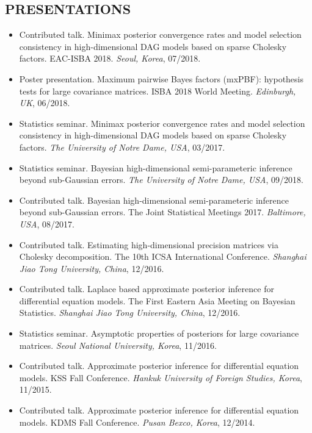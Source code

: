 \documentclass[margin, 10pt]{res} %
\begin{document}
\begin{resume}
 
\section{\sf PRESENTATIONS}

\begin{itemize}
	\item Contributed talk. 
	Minimax posterior convergence rates and model selection consistency in high-dimensional DAG models based on sparse Cholesky factors. 
	EAC-ISBA 2018. \emph{Seoul, Korea}, 07/2018.
	\item Poster presentation.
	Maximum pairwise Bayes factors (mxPBF): hypothesis tests for large covariance matrices.
	ISBA 2018 World Meeting. \emph{Edinburgh, UK}, 06/2018.
	\item Statistics seminar. Minimax posterior convergence rates and model selection consistency in high-dimensional DAG models based on sparse Cholesky factors. \emph{The University of Notre Dame, USA}, 03/2017.
	\item Statistics seminar. Bayesian high-dimensional semi-parameteric inference beyond sub-Gaussian errors. \emph{The University of Notre Dame, USA}, 09/2018.
	\item Contributed talk.  
	Bayesian high-dimensional semi-parameteric inference beyond sub-Gaussian errors.
	The Joint Statistical Meetings 2017. \emph{Baltimore, USA}, 08/2017.
	\item Contributed talk.  
	Estimating high-dimensional precision matrices via Cholesky decomposition.
	The 10th ICSA International Conference. \emph{Shanghai Jiao Tong University, China}, 12/2016.
	\item Contributed talk.  
	Laplace based approximate posterior inference for differential equation models. 
	The First Eastern Asia Meeting on Bayesian Statistics. \emph{Shanghai Jiao Tong University, China}, 12/2016.
	\item Statistics seminar. 
	Asymptotic properties of posteriors for large covariance matrices.
	\emph{Seoul National University, Korea}, 11/2016.
	\item Contributed talk.
	Approximate posterior inference for differential equation models.
	KSS Fall Conference. \emph{Hankuk University of Foreign Studies, Korea}, 11/2015.
	\item Contributed talk.
	Approximate posterior inference for differential equation models.
	KDMS Fall Conference. \emph{Pusan Bexco, Korea}, 12/2014.
\end{itemize}



\end{resume}
\end{document}
